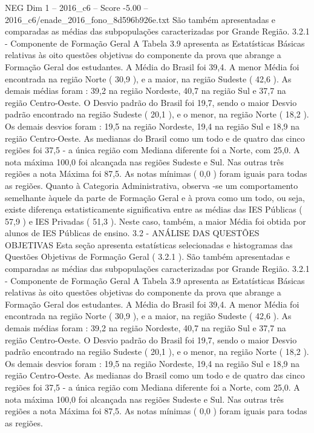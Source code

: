 \begin{textsample}{NEG Dim 1 – 2016\_c6 – Score -5.00 – 2016\_c6/enade\_2016\_fono\_8d596b926e.txt}
São também apresentadas e comparadas as médias das subpopulações caracterizadas por Grande Região. 3.2.1 - Componente de Formação Geral A Tabela 3.9 apresenta as Estatísticas Básicas relativas às oito questões objetivas do componente da prova que abrange a Formação Geral dos estudantes.
A Média do Brasil foi 39,4.
A menor Média foi encontrada na região Norte ( 30,9 ), e a maior, na região Sudeste ( 42,6 ).
As demais médias foram : 39,2 na região Nordeste, 40,7 na região Sul e 37,7 na região Centro-Oeste.
O Desvio padrão do Brasil foi 19,7, sendo o maior Desvio padrão encontrado na região Sudeste ( 20,1 ), e o menor, na região Norte ( 18,2 ).
Os demais desvios foram : 19,5 na região Nordeste, 19,4 na região Sul e 18,9 na região Centro-Oeste.
As medianas do Brasil como um todo e de quatro das cinco regiões foi 37,5 - a única região com Mediana diferente foi a Norte, com 25,0.
A nota máxima 100,0 foi alcançada nas regiões Sudeste e Sul.
Nas outras três regiões a nota Máxima foi 87,5.
As notas mínimas ( 0,0 ) foram iguais para todas as regiões.
Quanto à Categoria Administrativa, observa -se um comportamento semelhante àquele da parte de Formação Geral e à prova como um todo, ou seja, existe diferença estatisticamente significativa entre as médias das IES Públicas ( 57,9 ) e IES Privadas ( 51,3 ).
Neste caso, também, a maior Média foi obtida por alunos de IES Públicas de ensino. 3.2 - ANÁLISE DAS QUESTÕES OBJETIVAS Esta seção apresenta estatísticas selecionadas e histogramas das Questões Objetivas de Formação Geral ( 3.2.1 ).
São também apresentadas e comparadas as médias das subpopulações caracterizadas por Grande Região. 3.2.1 - Componente de Formação Geral A Tabela 3.9 apresenta as Estatísticas Básicas relativas às oito questões objetivas do componente da prova que abrange a Formação Geral dos estudantes.
A Média do Brasil foi 39,4.
A menor Média foi encontrada na região Norte ( 30,9 ), e a maior, na região Sudeste ( 42,6 ).
As demais médias foram : 39,2 na região Nordeste, 40,7 na região Sul e 37,7 na região Centro-Oeste.
O Desvio padrão do Brasil foi 19,7, sendo o maior Desvio padrão encontrado na região Sudeste ( 20,1 ), e o menor, na região Norte ( 18,2 ).
Os demais desvios foram : 19,5 na região Nordeste, 19,4 na região Sul e 18,9 na região Centro-Oeste.
As medianas do Brasil como um todo e de quatro das cinco regiões foi 37,5 - a única região com Mediana diferente foi a Norte, com 25,0.
A nota máxima 100,0 foi alcançada nas regiões Sudeste e Sul.
Nas outras três regiões a nota Máxima foi 87,5.
As notas mínimas ( 0,0 ) foram iguais para todas as regiões.

\end{textsample}
